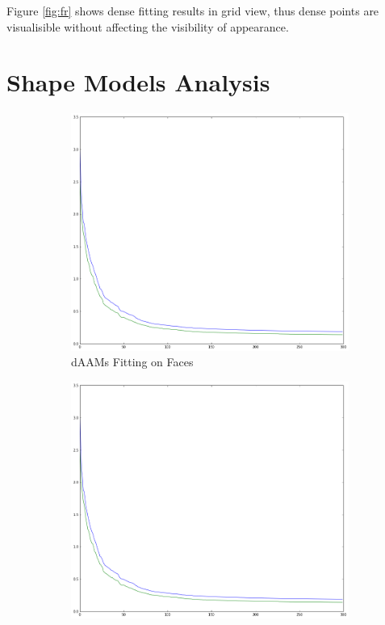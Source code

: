 Figure \ref{fig:fr} shows dense fitting results in grid view, thus dense points are visualisible without affecting the visibility of appearance.

\section{Shape Models Analysis}
\label{sec:modelanalysis}

\begin{figure}[h!]
    \centering
    \begin{subfigure}[b]{0.2\textwidth}
            \includegraphics[width=\textwidth]{supports/Model_Analysis/Shape_Reconstruct_ear}
        \caption{dAAMs Fitting on Faces}
    \end{subfigure}
    \qquad
    \begin{subfigure}[b]{0.2\textwidth}
            \includegraphics[width=\textwidth]{supports/Model_Analysis/Shape_Reconstruct_ear_test}

\end{subfigure}
\end{figure}
